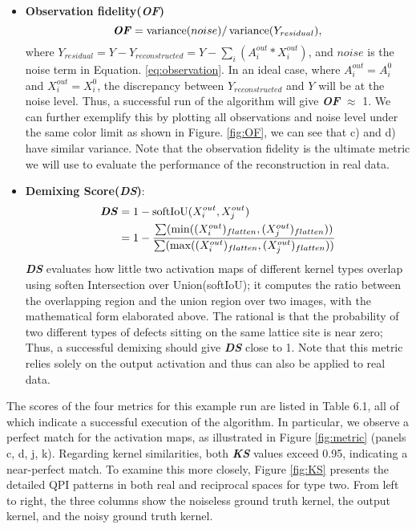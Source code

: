 \begin{itemize}
	\item \textbf{Observation fidelity(\textit{OF})}
	\begin{equation}
		\textbf{\textit{OF}} = \operatorname{variance}(noise)/\operatorname{variance}(Y_{residual}),
	\end{equation}
	where $Y_{residual} = Y - Y_{reconstructed} = Y - \sum_i(A^{out}_i * X^{out}_i)$, and $noise$ is the noise term in Equation. \ref{eq:observation}. In an ideal case, where $A^{out}_i = A^{0}_i$ and $X^{out}_i = X^{0}_i$, the discrepancy between $Y_{reconstructed}$ and $Y$ will be at the noise level. Thus, a successful run of the algorithm will give \textbf{\textit{OF}} $\approx$ 1. We can further exemplify this by plotting all observations and noise level under the same color limit as shown in Figure. \ref{fig:OF}, we can see that c) and d) have similar variance. Note that the observation fidelity is the ultimate metric we will use to evaluate the performance of the reconstruction in real data. 
	
	\item \textbf{Demixing Score(\textit{DS})}:
	\begin{align}
		\textbf{\textit{DS}} &= 1 - \operatorname{softIoU}(X_i^{out},X_j^{out}) \\
		&= 1 - \frac{\sum(\operatorname{min}((X_i^{out})_{flatten}, (X_j^{out})_{flatten}))}{\sum(\operatorname{max}((X_i^{out})_{flatten}, (X_j^{out})_{flatten}))}
	\end{align}
	\textbf{\textit{DS}} evaluates how little two activation maps of different kernel types overlap using soften Intersection over Union(softIoU); it computes the ratio between the overlapping region and the union region over two images, with the mathematical form elaborated above. The rational is that the probability of two different types of defects sitting on the same lattice site is near zero; Thus, a successful demixing should give \textbf{\textit{DS}} close to 1. Note that this metric relies solely on the output activation and thus can also be applied to real data.  
\end{itemize}

The scores of the four metrics for this example run are listed in Table 6.1, all of which indicate a successful execution of the algorithm. In particular, we observe a perfect match for the activation maps, as illustrated in Figure \ref{fig:metric} (panels c, d, j, k). Regarding kernel similarities, both \textbf{\textit{KS}} values exceed 0.95, indicating a near-perfect match. To examine this more closely, Figure \ref{fig:KS} presents the detailed \ac{QPI} patterns in both real and reciprocal spaces for type two. From left to right, the three columns show the noiseless ground truth kernel, the output kernel, and the noisy ground truth kernel.

